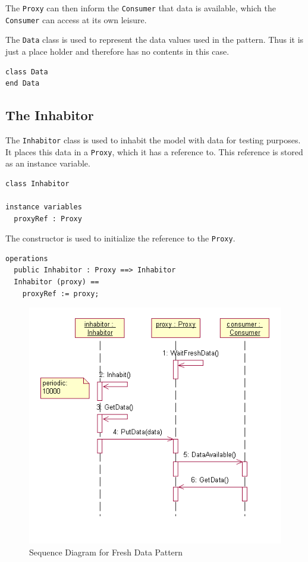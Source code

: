 \documentclass{overturerepchap}
\begin{document}
The \texttt{Proxy} can then inform the \texttt{Consumer} that data is
available, which the \texttt{Consumer} can access at its own leisure.

The \texttt{Data} class is used to represent the data values used in
the pattern. Thus it is just a place holder and therefore has no
contents in this case.

\begin{lstlisting}
class Data
end Data
\end{lstlisting}

\subsection{The Inhabitor}

The \texttt{Inhabitor} class is used to inhabit the model with data
for testing purposes. It places this data in a \texttt{Proxy}, which
it has a reference to. This reference is stored as an instance
variable.

\begin{lstlisting}
class Inhabitor

instance variables
  proxyRef : Proxy
\end{lstlisting}

The constructor is used to initialize the reference to the
\texttt{Proxy}.

\begin{lstlisting}
operations
  public Inhabitor : Proxy ==> Inhabitor
  Inhabitor (proxy) ==
    proxyRef := proxy;
\end{lstlisting}

\begin{figure}
\begin{center}
\includegraphics[width=.6\textwidth]{figures/freshdataseqdiag.png}
\end{center}
\caption{Sequence Diagram for Fresh Data Pattern\label{fig:seqdiafresh} }
\end{figure}
\end{document}
